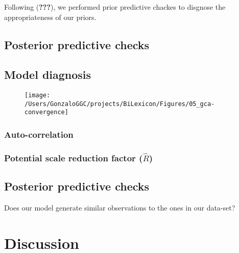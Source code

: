 \documentclass[english,man,man,floatsintext]{apa6}
\begin{document}
Following ({\textbf{???}}), we performed prior predictive chackes to disgnose the appropriateness of our priors.

\hypertarget{posterior-predictive-checks}{%
\subsection{Posterior predictive checks}\label{posterior-predictive-checks}}

\hypertarget{model-diagnosis}{%
\subsection{Model diagnosis}\label{model-diagnosis}}

\begin{figure}

{\centering \texttt{[image: /Users/GonzaloGGC/projects/BiLexicon/Figures/05\_gca-convergence]} 

}

\caption{ }\label{fig:convergence}
\end{figure}

\hypertarget{auto-correlation}{%
\subsubsection{Auto-correlation}\label{auto-correlation}}

\hypertarget{potential-scale-reduction-factor-hatr}{%
\subsubsection{\texorpdfstring{Potential scale reduction factor (\(\hat{R}\))}{Potential scale reduction factor (\textbackslash{}hat\{R\})}}\label{potential-scale-reduction-factor-hatr}}

\hypertarget{posterior-predictive-checks-1}{%
\subsection{Posterior predictive checks}\label{posterior-predictive-checks-1}}

Does our model generate similar observations to the ones in our data-set?

\hypertarget{discussion}{%
\section{Discussion}\label{discussion}}
\end{document}
